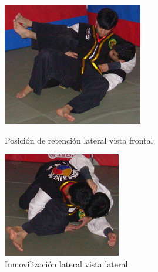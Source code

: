 \begin{enumerate}
	\begin{figure}[h]
		\centering
		\begin{minipage}{0.45\textwidth}
			\includegraphics[width=\linewidth]{images/Lucha_de_Piso/09_inmovilizacion_a_una_pierna_lateral.png}
			\caption{Posición de retención lateral vista frontal}
			\label{fig:inmovilizacion_dos_piernas_frontal_lp}
		\end{minipage}
		\hfill
		\begin{minipage}{0.45\textwidth}
			\includegraphics[width=\linewidth]{images/Lucha_de_Piso/10_inmovilizacion_a_una_pierna_lateral.png}
			\caption{Inmovilización lateral vista lateral}
			\label{fig:inmovilizacion_dos_piernas_lateral_lp}
		\end{minipage}
		\hfill
	\end{figure}




\end{enumerate}
